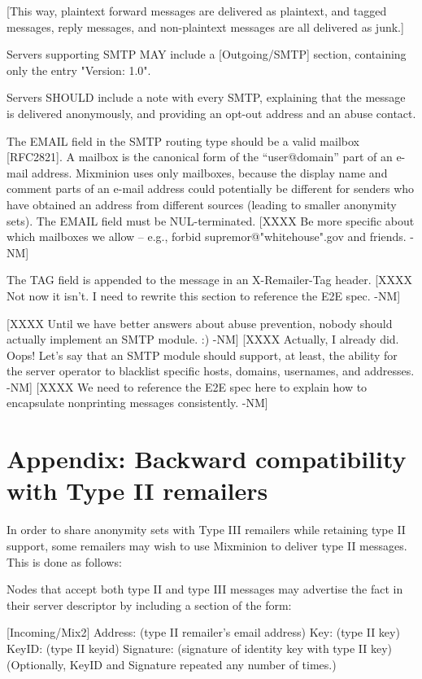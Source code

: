 [This way, plaintext forward messages are delivered as plaintext,
and tagged messages, reply messages, and non-plaintext messages are
all delivered as junk.]

Servers supporting SMTP MAY include a [Outgoing/SMTP] section,
containing only the entry "Version: 1.0".

Servers SHOULD include a note with every SMTP, explaining that the
message is delivered anonymously, and providing an opt-out address and
an abuse contact.

The EMAIL field in the SMTP routing type should be a valid mailbox
[RFC2821]. A mailbox is the canonical form of the ``user@domain''
part of an e-mail address. Mixminion uses only mailboxes, because the
display name and comment parts of an e-mail address could potentially be
different for senders who have obtained an address from different
sources (leading to smaller anonymity sets). The EMAIL field must be
NUL-terminated.
[XXXX Be more specific about which mailboxes we allow -- e.g., forbid
  supremor@"whitehouse".gov and friends. -NM]

The TAG field is appended to the message in an X-Remailer-Tag header.
[XXXX Not now it isn't.  I need to rewrite this section to reference
the E2E spec. -NM]

[XXXX Until we have better answers about abuse prevention, nobody should
  actually implement an SMTP module. :) -NM]
[XXXX Actually, I already did.  Oops!  Let's say that an SMTP module
  should support, at least, the ability for the server operator to
  blacklist specific hosts, domains, usernames, and addresses. -NM]
[XXXX We need to reference the E2E spec here to explain how to
  encapsulate nonprinting messages consistently. -NM]

\section{Appendix: Backward compatibility with Type II remailers}

In order to share anonymity sets with Type III remailers while
retaining type II support, some remailers may wish to use Mixminion to
deliver type II messages.  This is done as follows:

Nodes that accept both type II and type III messages may advertise the
fact in their server descriptor by including a section of the form:
 
         [Incoming/Mix2]
         Address: (type II remailer's email address)
         Key: (type II key)
	 KeyID: (type II keyid)
         Signature: (signature of identity key with type II key)
	 (Optionally, KeyID and Signature repeated any number of
                      times.)

